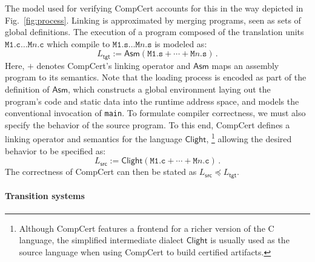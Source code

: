 \documentclass[draft,11pt]{report}
\newcommand{\kw}[1]{\ensuremath{ \mathsf{#1} }}
\newcommand{\refby}{\preceq}     %
\begin{document}
The model used for verifying CompCert accounts for this
in the way depicted in Fig.~\ref{fig:process}.
Linking is approximated by
merging programs, seen as sets of global definitions.
The execution
of a program composed of the translation units
$\texttt{M1.c} \ldots \texttt{M$n$.c}$
which compile to
$\texttt{M1.s} \ldots \texttt{M$n$.s}$
is modeled as:
\[
    L_\kw{tgt} :=
    \kw{Asm}(\texttt{M1.s} +
             \cdots +
             \texttt{M$n$.s}) \,.
\]
Here,
$+$ denotes CompCert's linking operator and
$\kw{Asm}$ maps an assembly program to its semantics.
Note that the loading process is encoded
as part of the definition of $\kw{Asm}$,
which constructs a global environment
laying out the program's code and static data
into the runtime address space,
and models the conventional invocation of \texttt{main}.
To formulate compiler correctness,
we must also specify the behavior of the source program.
To this end,
CompCert defines a linking operator
and semantics
for the language $\kw{Clight}$,%
\footnote{
  Although CompCert features a frontend for a richer version
  of the C language,
  the simplified intermediate dialect \kw{Clight}
  is usually used as the source language
  when using CompCert to build certified artifacts.
}
allowing the desired behavior to be specified as:
\[
    L_\kw{src} :=
    \kw{Clight}(\texttt{M1.c} + \cdots + \texttt{M$n$.c}) \,.
\]
The correctness of CompCert
can then be stated as $L_\kw{src} \refby L_\kw{tgt}$.

\paragraph{Transition systems} %
\end{document}
